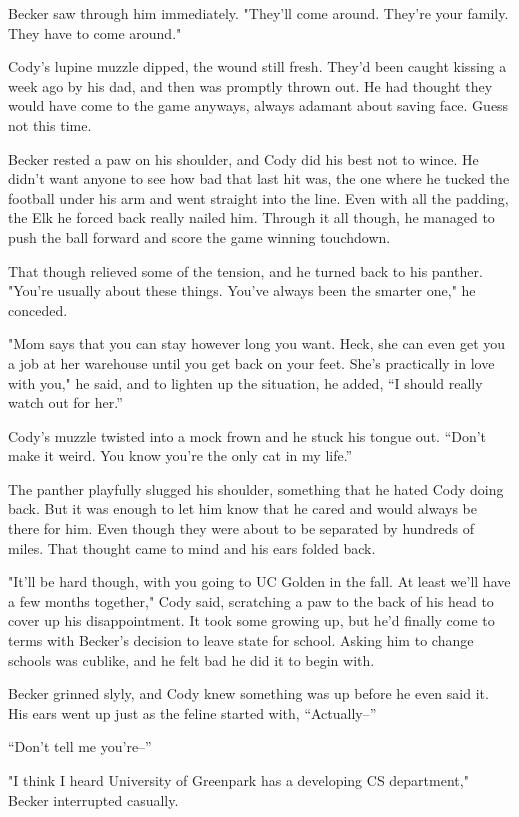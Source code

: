 Becker saw through him immediately. "They'll come around. They're your
family. They have to come around."

Cody's lupine muzzle dipped, the wound still fresh. They'd been caught
kissing a week ago by his dad, and then was promptly thrown out. He had
thought they would have come to the game anyways, always adamant about
saving face. Guess not this time.

Becker rested a paw on his shoulder, and Cody did his best not to wince.
He didn't want anyone to see how bad that last hit was, the one where he
tucked the football under his arm and went straight into the line. Even
with all the padding, the Elk he forced back really nailed him. Through
it all though, he managed to push the ball forward and score the game
winning touchdown.

That though relieved some of the tension, and he turned back to his
panther. "You're usually about these things. You've always been the
smarter one," he conceded.

"Mom says that you can stay however long you want. Heck, she can even
get you a job at her warehouse until you get back on your feet. She's
practically in love with you," he said, and to lighten up the situation,
he added, ``I should really watch out for her.''

Cody's muzzle twisted into a mock frown and he stuck his tongue out.
``Don't make it weird. You know you're the only cat in my life.''

The panther playfully slugged his shoulder, something that he hated Cody
doing back. But it was enough to let him know that he cared and would
always be there for him. Even though they were about to be separated by
hundreds of miles. That thought came to mind and his ears folded back.

"It'll be hard though, with you going to UC Golden in the fall. At least
we'll have a few months together," Cody said, scratching a paw to the
back of his head to cover up his disappointment. It took some growing
up, but he'd finally come to terms with Becker's decision to leave state
for school. Asking him to change schools was cublike, and he felt bad he
did it to begin with.

Becker grinned slyly, and Cody knew something was up before he even said
it. His ears went up just as the feline started with, ``Actually--''

``Don't tell me you're--''

"I think I heard University of Greenpark has a developing CS
department," Becker interrupted casually.

